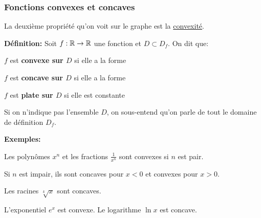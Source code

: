 \documentclass[8pt,handout]{beamer} %
\begin{document}
\begin{frame}[plain]
\frametitle{\bf Fonctions convexes et concaves}
\medskip 

{\small 
La deuxi\`eme propri\'et\'e qu'on voit sur le graphe est la 
\underline{convexit\'e}.}
\vspace*{2mm}

{\bf D\'efinition:} 
Soit $f:\mathbb R\rightarrow\mathbb R$ une fonction et $D\subset D_f$. On dit que: 
\vspace*{1mm}

\begin{itemize}
\bitem
\parbox[t]{6cm}{
$f$ est {\bf convexe sur $D$} si elle a la forme 
}
\quad
\raisebox{-.5\height}{\convexe}  
\vspace*{1mm}

\bitem
\parbox[t]{6cm}{
$f$ est {\bf concave sur $D$} si elle a la forme
}
\quad
\raisebox{-.5\height}{\concave} 
\vspace*{1mm}

\bitem
\parbox[t]{6cm}{
$f$ est {\bf plate sur $D$} si elle est constante
}
\quad
\raisebox{-.5\height}{\constant}  
\end{itemize} 
\vspace*{1mm}

\pause
{\small
Si on n'indique pas l'ensemble $D$, on sous-entend qu'on parle de tout le 
domaine de d\'efinition $D_f$.
} 
\vspace*{2mm}

\pause
{\small 
{\bf Exemples:}
\begin{itemize}
\bitem
Les polyn\^omes $x^n$ et les fractions $\frac{1}{x^n}$ sont convexes si $n$ 
est pair. 
\vspace*{1mm}

Si $n$ est impair, ils sont concaves pour $x<0$ et convexes pour $x>0$.  
\vspace*{1mm}

\bitem
Les racines $\sqrt[k]{x}$ sont concaves. 
\vspace*{1mm}

\bitem
L'exponentiel $e^x$ est convexe. Le logarithme $\ln x$ est concave. 
\end{itemize} 
}

\end{frame}


\raisebox{-.8\height}{\pair}
\raisebox{-.8\height}{\impair} 
\raisebox{-.8\height}{\periodique} 
\end{document}
